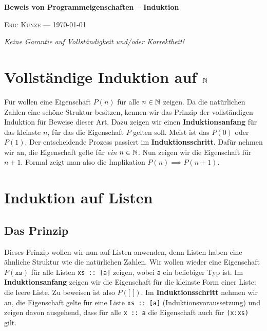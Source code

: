 \documentclass[ngerman, a4paper, 11pt]{article}
\newcommand{\begriff}[1]{\textbf{#1}}
\theoremstyle{nonumberplain}
\newcommand*\ruleline[1]{\par\noindent\raisebox{.8ex}{\makebox[\linewidth]{\hrulefill\hspace{1ex}\raisebox{-.8ex}{#1}\hspace{1ex}\hrulefill}}}
\begin{document}
	\begin{center}
		{\bfseries \sffamily \huge Beweis von Programmeigenschaften -- Induktion} 
		
		\ruleline{\sffamily \Large Übungsblatt 5}
		
		{\scshape Eric Kunze --- \today}
	\end{center}
	\medskip
	
	{ \footnotesize \doclicenseThis }
	
	\begin{center}
		\small \slshape Keine Garantie auf Vollständigkeit und/oder Korrektheit!
	\end{center}
	
\section*{Vollständige Induktion auf $\mathbb{N}$}


Für wollen eine Eigenschaft $P(n)$ für alle $n \in \mathbb{N}$ zeigen. Da die natürlichen Zahlen eine schöne Struktur besitzen, kennen wir das Prinzip der vollständigen Induktion für Beweise dieser Art. Dazu zeigen wir einen \begriff{Induktionsanfang} für das kleinste $n$, für das die Eigenschaft $P$ gelten soll. Meist ist das $P(0)$ oder $P(1)$. Der entscheidende Prozess passiert im \begriff{Induktionsschritt}. Dafür nehmen wir an, die Eigenschaft gelte für \textit{ein} $n \in \mathbb{N}$. Nun zeigen wir die Eigenschaft für $n+1$. Formal zeigt man also die Implikation $P(n) \implies P(n+1)$.

\section*{Induktion auf Listen}

\subsection*{Das Prinzip}
Dieses Prinzip wollen wir nun auf Listen anwenden, denn Listen haben eine ähnliche Struktur wie die natürlichen Zahlen. Wir wollen wieder eine Eigenschaft $P(\texttt{xs})$ für alle Listen \texttt{xs :: [a]} zeigen, wobei \texttt{a} ein beliebiger Typ ist. Im \begriff{Induktionsanfang} zeigen wir die Eigenschaft für die kleinste Form einer Liste: die leere Liste. Zu beweisen ist also $P(\texttt{[ ]})$. 
Im \begriff{Induktionsschritt} nehmen wir an, die Eigenschaft gelte für eine Liste \texttt{xs :: [a]} (Induktionsvoraussetzung) und zeigen davon ausgehend, dass für alle \texttt{x :: a} die Eigenschaft auch für \texttt{(x:xs)} gilt. 
\end{document}
